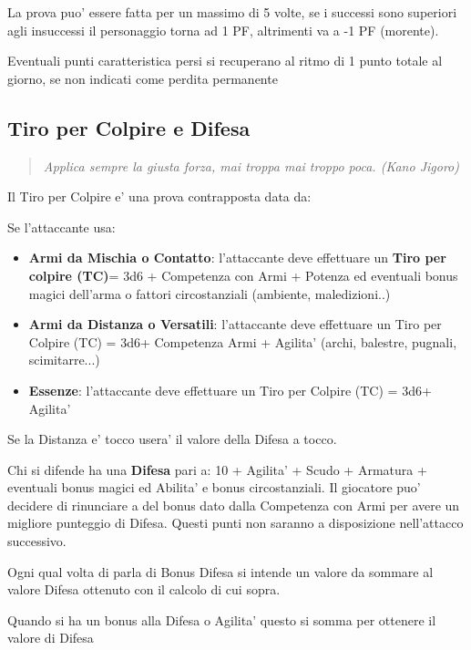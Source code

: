 \documentclass[a4paper,11pt,twoside,openany]{book}
\begin{document}
La prova puo’ essere fatta per un massimo di 5 volte, se i successi sono superiori agli insuccessi il personaggio torna ad 1 PF, altrimenti va a -1 PF (morente).

Eventuali punti caratteristica persi si recuperano al ritmo di 1 punto totale al giorno, se non indicati come perdita permanente
\pagebreak

\subsection{Tiro per Colpire e Difesa}

\label{tiro-per-colpire}
\begin{quote}\textit{Applica sempre la giusta forza, mai troppa mai troppo poca. (Kano Jigoro)
}\end{quote}

Il Tiro per Colpire e' una prova contrapposta data da:

Se l'attaccante usa:

\begin{itemize}
	\item \textbf{Armi da Mischia o Contatto}: l'attaccante deve effettuare un \textbf{Tiro per colpire (TC)}= 3d6 + Competenza con Armi + Potenza ed eventuali bonus magici dell'arma o fattori circostanziali (ambiente, maledizioni..)
	\item
	\textbf{Armi da Distanza o Versatili}: l'attaccante deve effettuare un Tiro per Colpire (TC) = 3d6+ Competenza Armi + Agilita' (archi, balestre, pugnali, scimitarre...)
	\item	\textbf{Essenze}: l'attaccante deve effettuare un Tiro per Colpire (TC) = 3d6+ Agilita' 
\end{itemize}

Se la Distanza e' tocco usera' il valore della Difesa a tocco.

Chi si difende ha una \textbf{Difesa} pari a: 10 + Agilita' + Scudo + Armatura + eventuali bonus magici ed Abilita' e bonus circostanziali. 
Il giocatore puo' decidere di rinunciare a del bonus dato dalla Competenza con Armi per avere un migliore punteggio di Difesa. Questi punti non saranno a disposizione nell'attacco successivo.

Ogni qual volta di parla di Bonus Difesa si intende un valore da sommare al valore Difesa ottenuto con il calcolo di cui sopra.

Quando si ha un bonus alla Difesa o Agilita' questo si somma per ottenere il valore di Difesa
\end{document}
